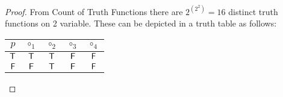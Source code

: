 \begin{proof}
	From Count of Truth Functions there are $2^{(2^2)}=16$
	distinct truth functions on 2 variable. These can be depicted in a truth table as follows:
	\begin{table}[h!]\centering
		\begin{tabular}{|c|cccc|}
			\hline
			$p$ & $\circ_1$ & $\circ_2$ & $\circ_3$ & $\circ_4$ \\
			\hline
			$\mathsf{T}$ & $\mathsf{T}$ & $\mathsf{T}$ & $\mathsf{F}$ & $\mathsf{F}$ \\
			$\mathsf{F}$ & $\mathsf{F}$ & $\mathsf{T}$ & $\mathsf{F}$ & $\mathsf{F}$ \\
			\hline
		\end{tabular}
	\end{table}
\end{proof}